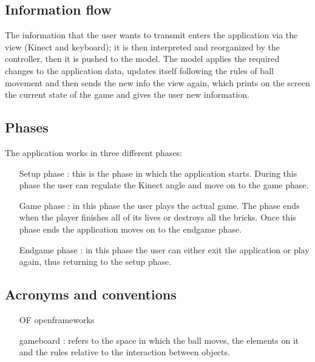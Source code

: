 \documentclass[]{article}
\begin{document}
\subsection{Information flow}
The information that the user wants to transmit enters the application via the view (Kinect and keyboard); it is then interpreted and reorganized by the controller, then it is pushed to the model. The model applies the required changes to the application data, updates itself following the rules of ball movement and then sends the new info the view again, which prints on the screen the current state of the game and gives the user new information.\\
\subsection{Phases}
The application works in three different phases:
\begin{itemize}
	\item [Setup phase] : this is the phase in which the application starts. During this phase the user can regulate the Kinect angle and move on to the game phase.
	\item  [Game phase] : in this phase the user plays the actual game. The phase ends when the player finishes all of its lives or destroys all the bricks. Once this phase ends the application moves on to the endgame phase.
	\item [Endgame phase] : in this phase the user can either exit the application or play again, thus returning to the setup phase. 
\end{itemize}
\subsection{Acronyms and conventions}
\begin{itemize}
	\item [OF] openframeworks
	\item [gameboard] : refers to the space in which the ball moves, the elements on it and the rules relative to the interaction between objects.
\end{itemize}
\newpage
\end{document}
